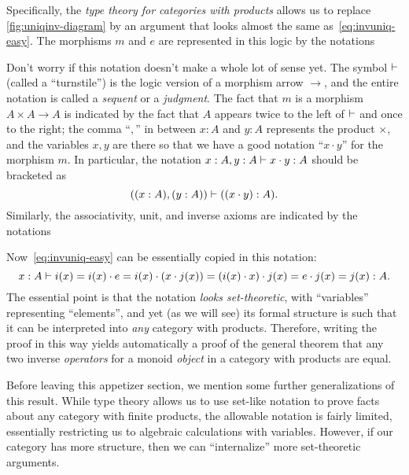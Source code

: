 Specifically, the \emph{type theory for categories with products} allows us to replace \cref{fig:uniqinv-diagram} by an argument that looks almost the same as~\eqref{eq:invuniq-easy}.
The morphisms $m$ and $e$ are represented in this logic by the notations
Don't worry if this notation doesn't make a whole lot of sense yet.
The symbol $\vdash$ (called a ``turnstile'') is the logic version of a morphism arrow $\to$, and the entire notation is called a \emph{sequent} or a \emph{judgment}.
The fact that $m$ is a morphism $A\times A \to A$ is indicated by the fact that $A$ appears twice to the left of $\vdash$ and once to the right; the comma ``$,$'' in between $x:A$ and $y:A$ represents the product $\times$, and the variables $x,y$ are there so that we have a good notation ``$x\cdot y$'' for the morphism $m$.
In particular, the notation $x:A,y:A \vdash x\cdot y :A$ should be bracketed as
\[ ((x:A),(y:A)) \vdash ((x\cdot y) :A). \]
Similarly, the associativity, unit, and inverse axioms are indicated by the notations
Now~\eqref{eq:invuniq-easy} can be essentially copied in this notation:
\[ x:A \vdash i(x) = i(x) \cdot e = i(x) \cdot (x \cdot j(x)) = (i(x)\cdot x)\cdot j(x) = e\cdot j(x) = j(x) : A.\]
The essential point is that the notation \emph{looks set-theoretic}, with ``variables'' representing ``elements'', and yet (as we will see) its formal structure is such that it can be interpreted into \emph{any} category with products.
Therefore, writing the proof in this way yields automatically a proof of the general theorem that any two inverse \emph{operators} for a monoid \emph{object} in a category with products are equal.

Before leaving this appetizer section, we mention some further generalizations of this result.
While type theory allows us to use set-like notation to prove facts about any category with finite products, the allowable notation is fairly limited, essentially restricting us to algebraic calculations with variables.
However, if our category has more structure, then we can ``internalize'' more set-theoretic arguments.

